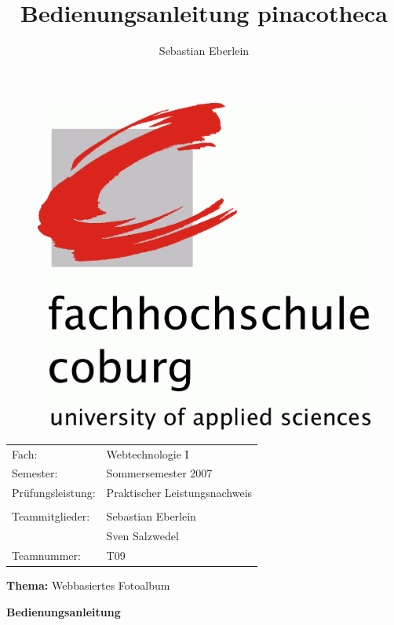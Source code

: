 \documentclass[a4paper,12pt,liststotocnumbered]{scrartcl}
\title{Bedienungsanleitung pinacotheca}
\author{Sebastian Eberlein}
\begin{document}
\pagestyle{empty}

\begin{figure}[h]
	\begin{center}
		\includegraphics[width=\textwidth/2]{logo}
	\end{center}
\end{figure}

\begin{tabularx}{\textwidth}{lX}
	Fach:&Webtechnologie I\\
	Semester:&Sommersemester 2007\\
	Prüfungsleistung:&Praktischer Leistungsnachweis\\
	&\\
	Teammitglieder:&Sebastian Eberlein\\
	&Sven Salzwedel\\
	Teamnummer:&T09\\
\end{tabularx}

\begin{center}
\end{center}

\begin{center}
	\Large{\textbf{Thema:} Webbasiertes Fotoalbum}\\
\end{center}
\begin{center}
	\Large{\textbf{Bedienungsanleitung}}\\
\end{center}
\end{document}
